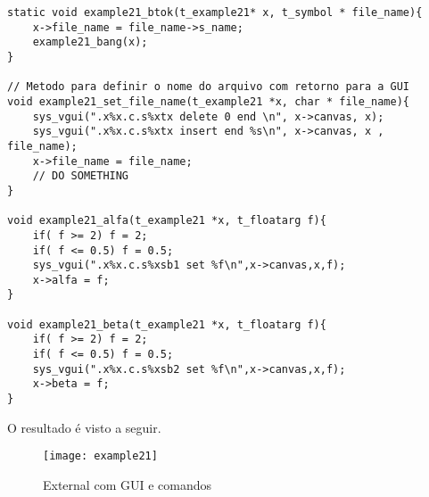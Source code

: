 \begin{lstlisting}
static void example21_btok(t_example21* x, t_symbol * file_name){
    x->file_name = file_name->s_name;
    example21_bang(x); 
}

// Metodo para definir o nome do arquivo com retorno para a GUI
void example21_set_file_name(t_example21 *x, char * file_name){
    sys_vgui(".x%x.c.s%xtx delete 0 end \n", x->canvas, x);
    sys_vgui(".x%x.c.s%xtx insert end %s\n", x->canvas, x , file_name);
    x->file_name = file_name;
    // DO SOMETHING
}

void example21_alfa(t_example21 *x, t_floatarg f){
    if( f >= 2) f = 2;
    if( f <= 0.5) f = 0.5; 
    sys_vgui(".x%x.c.s%xsb1 set %f\n",x->canvas,x,f);
    x->alfa = f;
}

void example21_beta(t_example21 *x, t_floatarg f){
    if( f >= 2) f = 2;
    if( f <= 0.5) f = 0.5; 
    sys_vgui(".x%x.c.s%xsb2 set %f\n",x->canvas,x,f);
    x->beta = f;
}
\end{lstlisting}

O resultado é visto a seguir.

\begin{figure}[h!]
	\centering
	\texttt{[image: example21]}
	\caption{External com GUI e comandos}
\end{figure}


